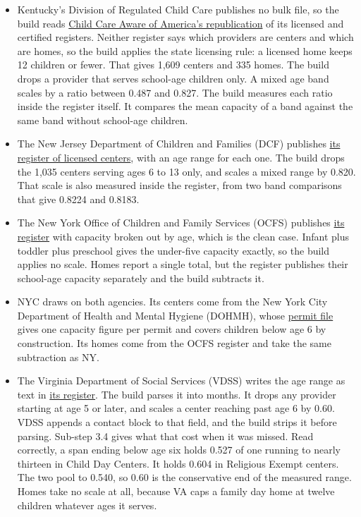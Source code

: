 \documentclass[11pt]{article}
\begin{document}
\begin{itemize}
\setlength{\itemsep}{0.45em}
\item Kentucky's Division of Regulated Child Care publishes no bulk file, so the
      build reads
      \href{https://services7.arcgis.com/s3vGpGobX9nzlLH3/arcgis/rest/services/Providers_Licensed/FeatureServer}{Child
      Care Aware of America's republication} of its licensed and certified
      registers. Neither register says which providers are centers and which are
      homes, so the build applies the state licensing rule: a licensed home
      keeps 12 children or fewer. That gives 1,609 centers and 335 homes.
      The build drops a provider that serves school-age children only. A mixed age band
      scales by a ratio between 0.487 and 0.827. The build measures each ratio
      inside the register itself. It compares the mean capacity of a band
      against the same band without school-age children.
\item The New Jersey Department of Children and Families (DCF) publishes
      \href{https://data.nj.gov/resource/cru5-4rmm.csv}{its register of licensed
      centers}, with an age range for each one. The build drops the 1,035
      centers serving ages 6 to 13 only, and scales a mixed range by 0.820. That
      scale is also measured inside the register, from two band comparisons that
      give 0.8224 and 0.8183.
\item The New York Office of Children and Family Services (OCFS) publishes
      \href{https://data.ny.gov/resource/cb42-qumz.csv}{its register} with
      capacity broken out by age, which is the clean case. Infant plus toddler
      plus preschool gives the under-five capacity exactly, so the build applies
      no scale.
      Homes report a single total, but the register publishes their school-age
      capacity separately and the build subtracts it.
\item NYC draws on both agencies. Its centers come from the New York City
      Department of Health and Mental Hygiene (DOHMH), whose
      \href{https://data.cityofnewyork.us/resource/gy3q-4tzp.csv}{permit file}
      gives one capacity figure per permit and covers children below age 6 by
      construction. Its homes come from the OCFS register and take the same
      subtraction as NY.
\item The Virginia Department of Social Services (VDSS) writes the age range as
      text in
      \href{https://legacy.dss.virginia.gov/facility/search/cc2.cgi}{its
      register}. The build parses it into months. It drops any provider starting
      at age 5 or later, and scales a center reaching past age 6 by 0.60. VDSS
      appends a contact block to that field, and the build strips it before
      parsing. Sub-step 3.4 gives what that cost when it was missed. Read
      correctly, a span ending below age six holds 0.527 of one running to
      nearly thirteen in Child Day Centers. It holds 0.604 in Religious Exempt
      centers. The two pool to 0.540, so 0.60 is the conservative end of the
      measured range. Homes take no scale at all, because VA caps a family day
      home at twelve children whatever ages it serves.
\end{itemize}
\end{document}
